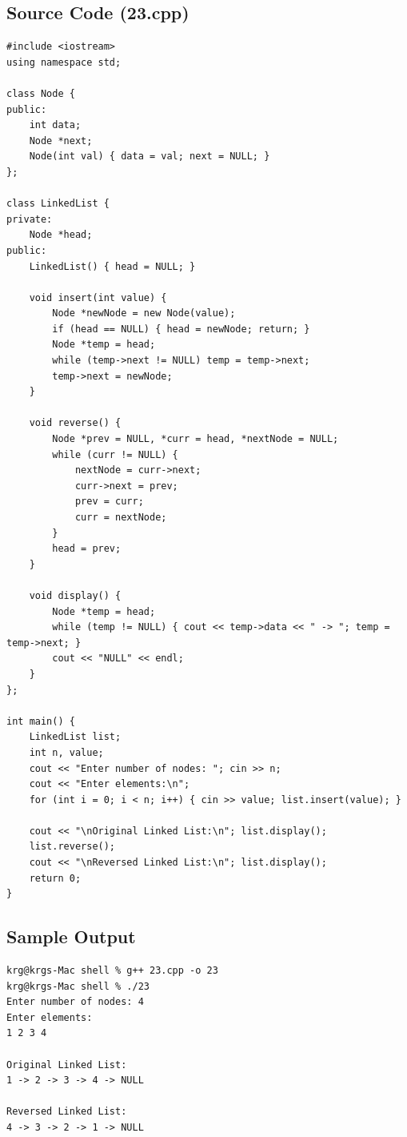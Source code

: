 \documentclass[a4paper,12pt]{article}
\begin{document}
\subsection*{Source Code (23.cpp)}
\begin{lstlisting}[style=cppstyle]
#include <iostream>
using namespace std;

class Node {
public:
    int data;
    Node *next;
    Node(int val) { data = val; next = NULL; }
};

class LinkedList {
private:
    Node *head;
public:
    LinkedList() { head = NULL; }

    void insert(int value) {
        Node *newNode = new Node(value);
        if (head == NULL) { head = newNode; return; }
        Node *temp = head;
        while (temp->next != NULL) temp = temp->next;
        temp->next = newNode;
    }

    void reverse() {
        Node *prev = NULL, *curr = head, *nextNode = NULL;
        while (curr != NULL) {
            nextNode = curr->next;
            curr->next = prev;
            prev = curr;
            curr = nextNode;
        }
        head = prev;
    }

    void display() {
        Node *temp = head;
        while (temp != NULL) { cout << temp->data << " -> "; temp = temp->next; }
        cout << "NULL" << endl;
    }
};

int main() {
    LinkedList list;
    int n, value;
    cout << "Enter number of nodes: "; cin >> n;
    cout << "Enter elements:\n";
    for (int i = 0; i < n; i++) { cin >> value; list.insert(value); }

    cout << "\nOriginal Linked List:\n"; list.display();
    list.reverse();
    cout << "\nReversed Linked List:\n"; list.display();
    return 0;
}
\end{lstlisting}

\subsection*{Sample Output}
\begin{lstlisting}[style=outputstyle]
krg@krgs-Mac shell % g++ 23.cpp -o 23
krg@krgs-Mac shell % ./23
Enter number of nodes: 4
Enter elements:
1 2 3 4

Original Linked List:
1 -> 2 -> 3 -> 4 -> NULL

Reversed Linked List:
4 -> 3 -> 2 -> 1 -> NULL
\end{lstlisting}

\newpage
\end{document}
